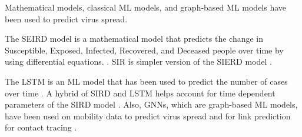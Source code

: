 \documentclass[times, 10pt,twocolumn]{article}
\begin{document}





Mathematical models, classical ML models, and graph-based ML models have been used to predict virus spread. 

The SEIRD model is a mathematical model that predicts the change in Susceptible, Exposed, Infected, Recovered, and Deceased people over time by using differential equations. \cite{SEIRD-LSTM}. SIR is simpler version of the SIERD model \cite{SIR}.

The LSTM is an ML model that has been used to predict the number of cases over time \cite{SEIRD-LSTM}. A hybrid of SIRD and LSTM helps account for time dependent parameters of the SIRD model \cite{SIRD-LSTM-hybrid}. Also, GNNs, which are graph-based ML models, have been used on mobility data to predict virus spread and for link prediction for contact tracing \cite{positivity-hospitalization-GNN}\cite{contact-tracing-GNN}.
\end{document}
